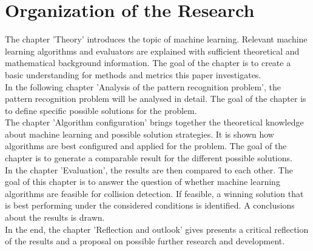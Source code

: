 \section{Organization of the Research}
The chapter 'Theory' introduces the topic of machine learning. Relevant machine learning algorithms and evaluators are explained with sufficient theoretical and mathematical background information. The goal of the chapter is to create a basic understanding for methods and metrics this paper investigates.
\\
In the following chapter 'Analysis of the pattern recognition problem', the pattern recognition problem will be analysed in detail. The goal of the chapter is to define specific possible solutions for the problem. 
\\
The chapter 'Algorithm configuration' brings together the theoretical knowledge about machine learning and possible solution strategies. It is shown how algorithms are best configured and applied for the problem. The goal of the chapter is to generate a comparable result for the different possible solutions. 
\\
In the chapter 'Evaluation', the results are then compared to each other. The goal of this chapter is to answer the question of whether machine learning algorithms are feasible for collision detection. If feasible, a winning solution that is best performing under the considered conditions is identified. A conclusions about the results is drawn. \\
In the end, the chapter 'Reflection and outlook' gives presents a critical reflection of the results and a proposal on possible further research and development.